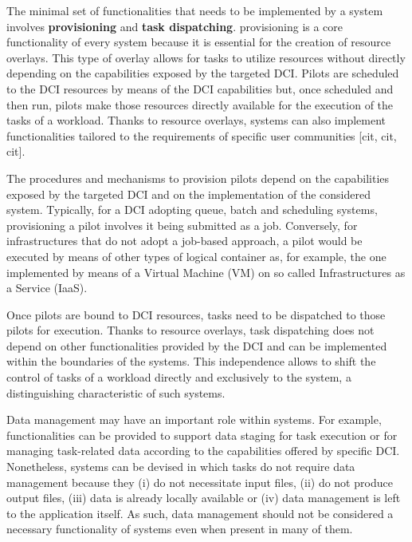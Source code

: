 \documentclass{sig-alternate}
\begin{document}
The minimal set of functionalities that needs to be implemented by a \pilotjob
system involves \textbf{\pilot provisioning} and \textbf{task dispatching}.
\pilot provisioning is a core functionality of every \pilot system because it
is essential for the creation of resource overlays. This type of overlay allows
for tasks to utilize resources without directly depending on the capabilities
exposed by the targeted DCI. Pilots are
scheduled to the DCI resources by means of the DCI capabilities but, once
scheduled and then run, pilots make those resources directly available for the
execution of the tasks of a workload. Thanks to resource overlays, \pilot systems can also
implement functionalities tailored to the requirements of specific user
communities [cit, cit, cit].

The procedures and mechanisms to provision pilots depend on the capabilities
exposed by the targeted DCI and on the implementation of the considered \pilot
system. Typically, for a DCI adopting queue, batch and scheduling systems,
provisioning a pilot involves it being submitted as a job. Conversely, for
infrastructures that do not adopt a job-based approach, a pilot would
be executed by means of other types of logical container as, for example, the
one implemented by means of a Virtual Machine (VM) on so called
Infrastructures as a Service (IaaS).

Once pilots are bound to DCI resources, tasks need to be dispatched to those
pilots for execution. Thanks to resource overlays, task dispatching does not
depend on other functionalities provided by the DCI and can be implemented
within the boundaries of the \pilot systems. This independence allows to shift
the control of tasks of a workload directly and exclusively to the \pilot
system, a distinguishing characteristic of such systems.

Data management may have an important role within \pilot systems. For example,
functionalities can be provided to support data staging for task execution or
for managing task-related data according to the capabilities offered by
specific DCI. Nonetheless, \pilot systems can be devised in which tasks do not
require data management because they (i) do not necessitate input files, (ii)
do not produce output files, (iii) data is already locally available or (iv)
data management is left to the application itself. As such, data management
should not be considered a necessary functionality of \pilot systems even when
present in many of them.
\end{document}
